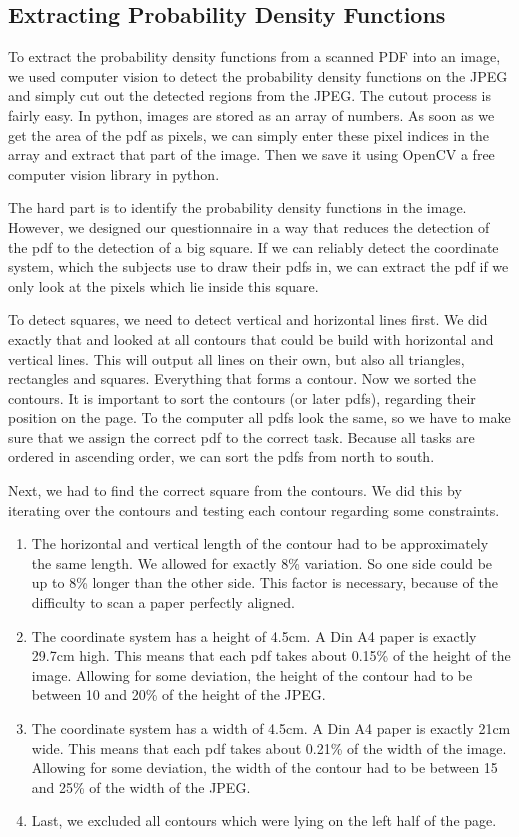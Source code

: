 \documentclass[../main/main.tex]{subfiles}
\begin{document}
	
	\subsection{Extracting Probability Density Functions}
	
	To extract the probability density functions from a scanned PDF into an image, we used computer vision to detect the probability density functions on the JPEG and simply cut out the detected regions from the JPEG. The cutout process is fairly easy. In python, images are stored as an array of numbers. As soon as we get the area of the pdf as pixels, we can simply enter these pixel indices in the array and extract that part of the image. Then we save it using OpenCV a free computer vision library in python.
	
	The hard part is to identify the probability density functions in the image. However, we designed our questionnaire in a way that reduces the detection of the pdf to the detection of a big square. If we can reliably detect the coordinate system, which the subjects use to draw their pdfs in, we can extract the pdf if we only look at the pixels which lie inside this square.
	
	To detect squares, we need to detect vertical and horizontal lines first. We did exactly that and looked at all contours that could be build with horizontal and vertical lines. This will output all lines on their own, but also all triangles, rectangles and squares. Everything that forms a contour. Now we sorted the contours. It is important to sort the contours (or later pdfs), regarding their position on the page. To the computer all pdfs look the same, so we have to make sure that we assign the correct pdf to the correct task. Because all tasks are ordered in ascending order, we can sort the pdfs from north to south.
	
	Next, we had to find the correct square from the contours. We did this by iterating over the contours and testing each contour regarding some constraints.
	
	\begin{enumerate}
		\item The horizontal and vertical length of the contour had to be approximately the same length. We allowed for exactly 8\% variation. So one side could be up to 8\% longer than the other side. This factor is necessary, because of the difficulty to scan a paper perfectly aligned.
		\item The coordinate system has a height of 4.5cm. A Din A4 paper is exactly 29.7cm high. This means that each pdf takes about 0.15\% of the height of the image. Allowing for some deviation, the height of the contour had to be between 10 and 20\% of the height of the JPEG. 
		\item The coordinate system has a width of 4.5cm. A Din A4 paper is exactly 21cm wide. This means that each pdf takes about 0.21\% of the width of the image. Allowing for some deviation, the width of the contour had to be between 15 and 25\% of the width of the JPEG. 
		\item Last, we excluded all contours which were lying on the left half of the page.
	\end{enumerate}
\end{document}
